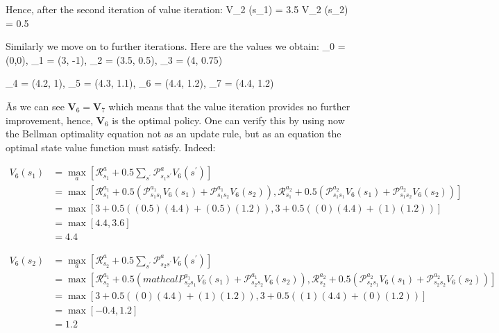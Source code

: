 \vspace{-10pt}

Hence, after the second iteration of value iteration:
\bse
V_2 (s_1) = 3.5 \qquad V_2 (s_2) = 0.5
\ese

Similarly we move on to further iterations. Here are the values we obtain:
\bse
{}_0 = (0,0), \qquad {}_1 = (3, -1), \qquad {}_2 = (3.5, 0.5), \qquad
{}_3 = (4, 0.75)
\ese

\bse
{}_4 = (4.2, 1), \qquad {}_5 = (4.3, 1.1), \qquad {}_6 = (4.4, 1.2), \qquad
{}_7 = (4.4, 1.2)
\ese

\v

As we can see $\boldsymbol{V}_6 = \boldsymbol{V}_7$ which means that the value iteration provides no further
improvement, hence, $\boldsymbol{V}_6$ is the optimal policy. One can verify this by using now the Bellman optimality
equation not as an update rule, but as an equation the optimal state value function must satisfy. Indeed:

{\setlength{\jot}{10pt}
\begin{align*}
V_6 (s_1) & = \max_{a} \left[ \mathcal{R}_{s_1}^{a} +
0.5 \sum_{s^{\prime}} \mathcal{P}_{s_1 s^\prime}^{a} V_6 (s^\prime) \right] \\
& = \max \left[ \mathcal{R}_{s_1}^{a_1} + 0.5 \left( \mathcal{P}_{s_1 s_1}^{a_1} V_6 (s_1) +
\mathcal{P}_{s_1 s_2}^{a_1} V_6 (s_2) \right), \mathcal{R}_{s_1}^{a_2} +
0.5 \left(\mathcal{P}_{s_1 s_1}^{a_2} V_6 (s_1) + \mathcal{P}_{s_1 s_2}^{a_2} V_6 (s_2) \right) \right] \\
& = \max \left[ 3 + 0.5 \left( (0.5) (4.4) + (0.5) (1.2) \right), 3 + 0.5 \left( (0) (4.4) + (1) (1.2) \right) \right] \\
& = \max \left[ 4.4, 3.6 \right] \\
& = 4.4
\end{align*}}

\vspace{-30pt}

{\setlength{\jot}{10pt}
\begin{align*}
V_6 (s_2) & = \max_{a} \left[ \mathcal{R}_{s_2}^{a} + 0.5 \sum_{s^{\prime}} \mathcal{P}_{s_2 s^\prime}^{a}
V_6 (s^\prime) \right] \\
& = \max \left[ \mathcal{R}_{s_2}^{a_1} +
0.5 \left(mathcal{P}_{s_2 s_1}^{a_1} V_6 (s_1) + \mathcal{P}_{s_2 s_2}^{a_1} V_6 (s_2) \right),
\mathcal{R}_{s_2}^{a_2} + 0.5 \left( \mathcal{P}_{s_2 s_1}^{a_2} V_6 (s_1) +
\mathcal{P}_{s_2 s_2}^{a_2} V_6 (s_2) \right) \right] \\
& = \max \left[ 3 + 0.5 \left( (0) (4.4) + (1) (1.2) \right), 3 + 0.5 \left( (1) (4.4) + (0) (1.2) \right) \right] \\
& = \max \left[ -0.4, 1.2 \right] \\
& = 1.2
\end{align*}}

